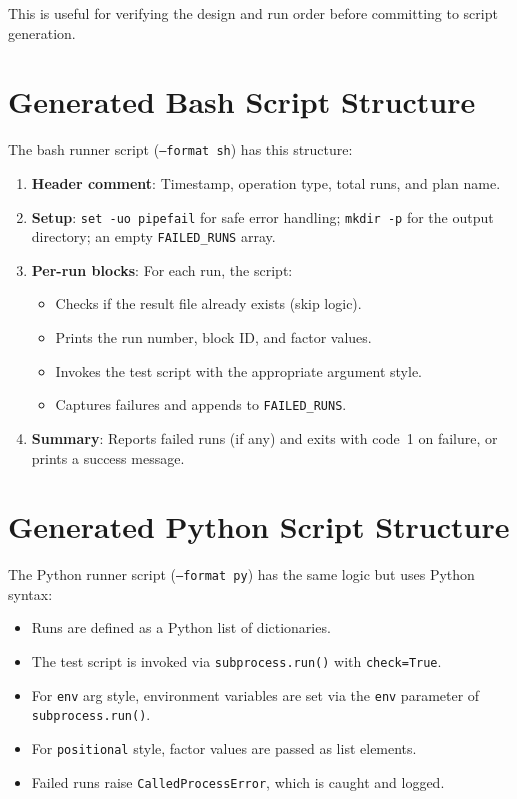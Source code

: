 \documentclass[11pt]{book}
\begin{document}
This is useful for verifying the design and run order before committing to script generation.

\section{Generated Bash Script Structure}

The bash runner script (\texttt{--format sh}) has this structure:

\begin{enumerate}
  \item \textbf{Header comment}: Timestamp, operation type, total runs, and plan name.
  \item \textbf{Setup}: \texttt{set -uo pipefail} for safe error handling; \texttt{mkdir -p} for the output directory; an empty \texttt{FAILED\_RUNS} array.
  \item \textbf{Per-run blocks}: For each run, the script:
    \begin{itemize}
      \item Checks if the result file already exists (skip logic).
      \item Prints the run number, block ID, and factor values.
      \item Invokes the test script with the appropriate argument style.
      \item Captures failures and appends to \texttt{FAILED\_RUNS}.
    \end{itemize}
  \item \textbf{Summary}: Reports failed runs (if any) and exits with code~1 on failure, or prints a success message.
\end{enumerate}

\section{Generated Python Script Structure}

The Python runner script (\texttt{--format py}) has the same logic but uses Python syntax:

\begin{itemize}
  \item Runs are defined as a Python list of dictionaries.
  \item The test script is invoked via \texttt{subprocess.run()} with \texttt{check=True}.
  \item For \texttt{env} arg style, environment variables are set via the \texttt{env} parameter of \texttt{subprocess.run()}.
  \item For \texttt{positional} style, factor values are passed as list elements.
  \item Failed runs raise \texttt{CalledProcessError}, which is caught and logged.
\end{itemize}
\end{document}
